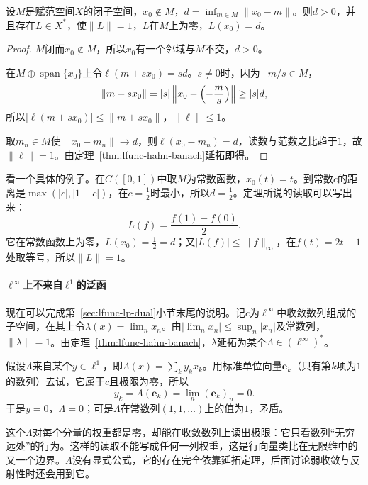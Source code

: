 \begin{theorem}[距离泛函]
\label{thm:lfunc-distance-functional}
设$M$是赋范空间$X$的闭子空间，$x_0\notin M$，$d=\inf_{m\in M}\lVert x_0-m\rVert$。则$d>0$，并且存在$L\in X^*$，使$\lVert L\rVert=1$，$L$在$M$上为零，$L(x_0)=d$。
\end{theorem}

\begin{proof}
$M$闭而$x_0\notin M$，所以$x_0$有一个邻域与$M$不交，$d>0$。

在$M\oplus\operatorname{span}\{x_0\}$上令$\ell(m+sx_0)=sd$。$s\neq0$时，因为$-m/s\in M$，
\[
\lVert m+sx_0\rVert=\lvert s\rvert\,\Bigl\lVert x_0-\Bigl(-\frac ms\Bigr)\Bigr\rVert\geq\lvert s\rvert d ,
\]
所以$\lvert\ell(m+sx_0)\rvert\leq\lVert m+sx_0\rVert$，$\lVert\ell\rVert\leq1$。

取$m_n\in M$使$\lVert x_0-m_n\rVert\to d$，则$\ell(x_0-m_n)=d$，读数与范数之比趋于$1$，故$\lVert\ell\rVert=1$。由定理~\ref{thm:lfunc-hahn-banach}延拓即得。
\end{proof}

看一个具体的例子。在$C([0,1])$中取$M$为常数函数，$x_0(t)=t$。到常数$c$的距离是$\max(\lvert c\rvert,\lvert1-c\rvert)$，在$c=\tfrac12$时最小，所以$d=\tfrac12$。定理所说的读取可以写出来：
\[
L(f)=\frac{f(1)-f(0)}{2} .
\]
它在常数函数上为零，$L(x_0)=\tfrac12=d$；又$\lvert L(f)\rvert\leq\lVert f\rVert_\infty$，在$f(t)=2t-1$处取等号，所以$\lVert L\rVert=1$。

\paragraph{\texorpdfstring{$\ell^\infty$}{l-infinity}上不来自\texorpdfstring{$\ell^1$}{l1}的泛函}
现在可以完成第~\ref{sec:lfunc-lp-dual}小节末尾的说明。记$c$为$\ell^\infty$中收敛数列组成的子空间，在其上令$\lambda(x)=\lim_nx_n$。由$\lvert\lim_n x_n\rvert\leq\sup_n\lvert x_n\rvert$及常数列，$\lVert\lambda\rVert=1$。由定理~\ref{thm:lfunc-hahn-banach}，$\lambda$延拓为某个$\Lambda\in(\ell^\infty)^*$。

假设$\Lambda$来自某个$y\in\ell^1$，即$\Lambda(x)=\sum_ky_kx_k$。用标准单位向量$\bm e_k$（只有第$k$项为$1$的数列）去试，它属于$c$且极限为零，所以
\[
y_k=\Lambda(\bm e_k)=\lim_n(\bm e_k)_n=0 .
\]
于是$y=0$，$\Lambda=0$；可是$\Lambda$在常数列$(1,1,\ldots)$上的值为$1$，矛盾。

这个$\Lambda$对每个分量的权重都是零，却能在收敛数列上读出极限：它只看数列“无穷远处”的行为。这样的读取不能写成任何一列权重，这是行向量类比在无限维中的又一个边界。$\Lambda$没有显式公式，它的存在完全依靠延拓定理，后面讨论弱收敛与反射性时还会用到它。

